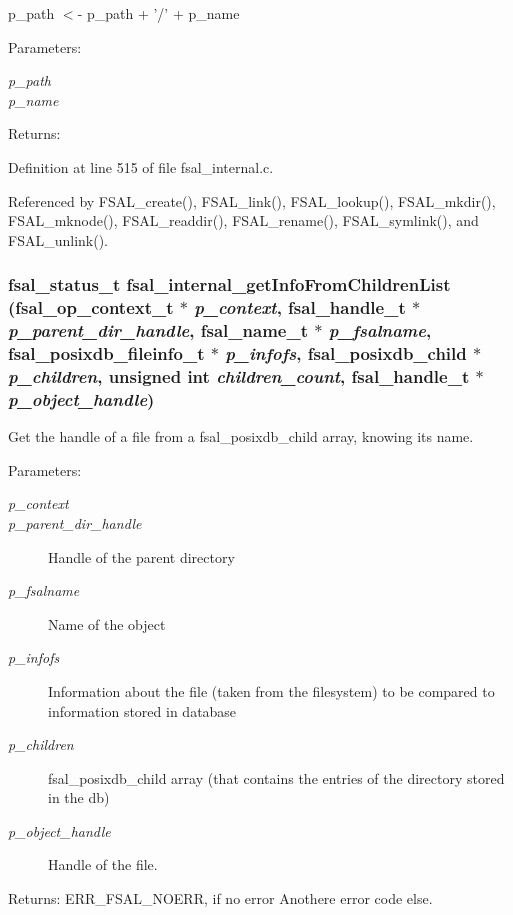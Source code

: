 p\_\-path $<$- p\_\-path + '/' + p\_\-name 

\begin{Desc}
\item[Parameters:]
\begin{description}
\item[{\em p\_\-path}]\item[{\em p\_\-name}]\end{description}
\end{Desc}
\begin{Desc}
\item[Returns:]\end{Desc}


Definition at line 515 of file fsal\_\-internal.c.

Referenced by FSAL\_\-create(), FSAL\_\-link(), FSAL\_\-lookup(), FSAL\_\-mkdir(), FSAL\_\-mknode(), FSAL\_\-readdir(), FSAL\_\-rename(), FSAL\_\-symlink(), and FSAL\_\-unlink().
\subsubsection[{fsal\_\-internal\_\-getInfoFromChildrenList}]{\setlength{\rightskip}{0pt plus 5cm}fsal\_\-status\_\-t fsal\_\-internal\_\-getInfoFromChildrenList (fsal\_\-op\_\-context\_\-t $\ast$ {\em p\_\-context}, \/  fsal\_\-handle\_\-t $\ast$ {\em p\_\-parent\_\-dir\_\-handle}, \/  fsal\_\-name\_\-t $\ast$ {\em p\_\-fsalname}, \/  fsal\_\-posixdb\_\-fileinfo\_\-t $\ast$ {\em p\_\-infofs}, \/  fsal\_\-posixdb\_\-child $\ast$ {\em p\_\-children}, \/  unsigned int {\em children\_\-count}, \/  fsal\_\-handle\_\-t $\ast$ {\em p\_\-object\_\-handle})}\label{fsal__internal_8c_480bb0144f04d4c75a708f6449f4b815}


Get the handle of a file from a fsal\_\-posixdb\_\-child array, knowing its name. 

\begin{Desc}
\item[Parameters:]
\begin{description}
\item[{\em p\_\-context}]\item[{\em p\_\-parent\_\-dir\_\-handle}]Handle of the parent directory \item[{\em p\_\-fsalname}]Name of the object \item[{\em p\_\-infofs}]Information about the file (taken from the filesystem) to be compared to information stored in database \item[{\em p\_\-children}]fsal\_\-posixdb\_\-child array (that contains the entries of the directory stored in the db) \item[{\em p\_\-object\_\-handle}]Handle of the file.\end{description}
\end{Desc}
\begin{Desc}
\item[Returns:]ERR\_\-FSAL\_\-NOERR, if no error Anothere error code else. \end{Desc}


